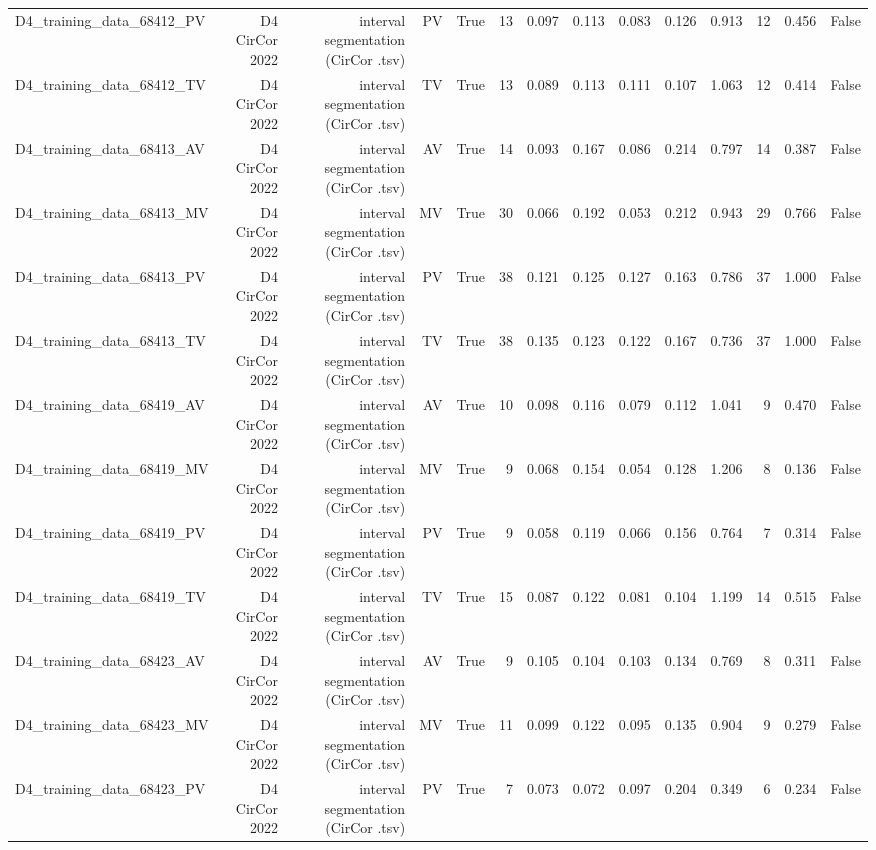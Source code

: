 \begin{table}[htbp]
\begin{tabular}{lrrrrrrrrrrrrr}
    D4\_training\_data\_68412\_PV & D4 CirCor 2022 & interval segmentation (CirCor .tsv) & PV & True & 13 & 0.097 & 0.113 & 0.083 & 0.126 & 0.913 & 12 & 0.456 & False \\
    D4\_training\_data\_68412\_TV & D4 CirCor 2022 & interval segmentation (CirCor .tsv) & TV & True & 13 & 0.089 & 0.113 & 0.111 & 0.107 & 1.063 & 12 & 0.414 & False \\
    D4\_training\_data\_68413\_AV & D4 CirCor 2022 & interval segmentation (CirCor .tsv) & AV & True & 14 & 0.093 & 0.167 & 0.086 & 0.214 & 0.797 & 14 & 0.387 & False \\
    D4\_training\_data\_68413\_MV & D4 CirCor 2022 & interval segmentation (CirCor .tsv) & MV & True & 30 & 0.066 & 0.192 & 0.053 & 0.212 & 0.943 & 29 & 0.766 & False \\
    D4\_training\_data\_68413\_PV & D4 CirCor 2022 & interval segmentation (CirCor .tsv) & PV & True & 38 & 0.121 & 0.125 & 0.127 & 0.163 & 0.786 & 37 & 1.000 & False \\
    D4\_training\_data\_68413\_TV & D4 CirCor 2022 & interval segmentation (CirCor .tsv) & TV & True & 38 & 0.135 & 0.123 & 0.122 & 0.167 & 0.736 & 37 & 1.000 & False \\
    D4\_training\_data\_68419\_AV & D4 CirCor 2022 & interval segmentation (CirCor .tsv) & AV & True & 10 & 0.098 & 0.116 & 0.079 & 0.112 & 1.041 & 9 & 0.470 & False \\
    D4\_training\_data\_68419\_MV & D4 CirCor 2022 & interval segmentation (CirCor .tsv) & MV & True & 9 & 0.068 & 0.154 & 0.054 & 0.128 & 1.206 & 8 & 0.136 & False \\
    D4\_training\_data\_68419\_PV & D4 CirCor 2022 & interval segmentation (CirCor .tsv) & PV & True & 9 & 0.058 & 0.119 & 0.066 & 0.156 & 0.764 & 7 & 0.314 & False \\
    D4\_training\_data\_68419\_TV & D4 CirCor 2022 & interval segmentation (CirCor .tsv) & TV & True & 15 & 0.087 & 0.122 & 0.081 & 0.104 & 1.199 & 14 & 0.515 & False \\
    D4\_training\_data\_68423\_AV & D4 CirCor 2022 & interval segmentation (CirCor .tsv) & AV & True & 9 & 0.105 & 0.104 & 0.103 & 0.134 & 0.769 & 8 & 0.311 & False \\
    D4\_training\_data\_68423\_MV & D4 CirCor 2022 & interval segmentation (CirCor .tsv) & MV & True & 11 & 0.099 & 0.122 & 0.095 & 0.135 & 0.904 & 9 & 0.279 & False \\
    D4\_training\_data\_68423\_PV & D4 CirCor 2022 & interval segmentation (CirCor .tsv) & PV & True & 7 & 0.073 & 0.072 & 0.097 & 0.204 & 0.349 & 6 & 0.234 & False \\

\end{tabular}
\end{table}
